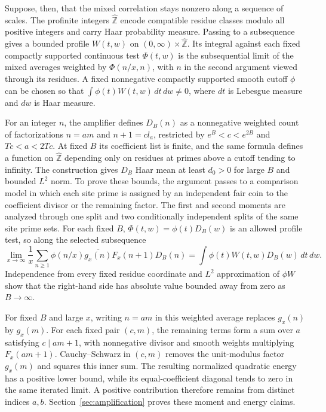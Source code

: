 Suppose, then, that the mixed correlation stays nonzero along a sequence
of scales.  The profinite integers $\widehat{\mathbb Z}$ encode compatible
residue classes modulo all positive integers and carry Haar probability
measure.  Passing to a subsequence gives a bounded profile $W(t,w)$ on
$(0,\infty)\times\widehat{\mathbb Z}$.  Its integral against each fixed
compactly supported continuous test $\Phi(t,w)$ is the subsequential limit
of the mixed averages weighted by $\Phi(n/x,n)$, with $n$ in the second
argument viewed through its residues.  A fixed nonnegative compactly
supported smooth cutoff $\phi$ can be chosen so that
$\int\phi(t)W(t,w)\,dt\,dw\ne0$, where $dt$ is Lebesgue measure and $dw$
is Haar measure.

For an integer $n$, the amplifier defines $D_B(n)$ as a nonnegative
weighted count of factorizations $n=am$ and $n+1=cl_a$, restricted by
$e^B<c<e^{2B}$ and $Tc<a<2Tc$.  At fixed $B$ its coefficient list is
finite, and the same formula defines a function on $\widehat{\mathbb Z}$
depending only on residues at primes above a cutoff tending to infinity.
The construction gives $D_B$ Haar mean at least $d_0>0$ for large $B$ and
bounded $L^2$ norm.  To prove these bounds, the argument passes to a
comparison model in which each site prime is assigned by an independent
fair coin to the coefficient divisor or the remaining factor.  The first
and second moments are analyzed through one split and two conditionally
independent splits of the same site prime sets.  For each fixed $B$,
$\Phi(t,w)=\phi(t)D_B(w)$ is an allowed profile test, so along the selected
subsequence
\[
 \lim_{x\to\infty}\frac1x\sum_{n\ge1}
   \phi(n/x)\overline{g_x(n)}F_x(n+1)D_B(n)
 =\int\phi(t)W(t,w)D_B(w)\,dt\,dw.
\]
Independence from every fixed residue coordinate and $L^2$ approximation
of $\phi W$ show that the right-hand side has absolute value bounded away
from zero as $B\to\infty$.

For fixed $B$ and large $x$, writing $n=am$ in this weighted average
replaces $g_x(n)$ by $g_x(m)$.
For each fixed pair $(c,m)$, the remaining terms form a sum over
$a$ satisfying $c\mid am+1$, with nonnegative divisor and smooth weights
multiplying $F_x(am+1)$.  Cauchy--Schwarz in $(c,m)$ removes the
unit-modulus factor $g_x(m)$ and squares this inner sum.  The resulting
normalized quadratic energy has a positive lower bound, while its
equal-coefficient diagonal tends to zero in the same iterated limit.  A positive contribution
therefore remains from distinct indices $a,b$.
Section~\ref{sec:amplification} proves these moment and energy claims.

